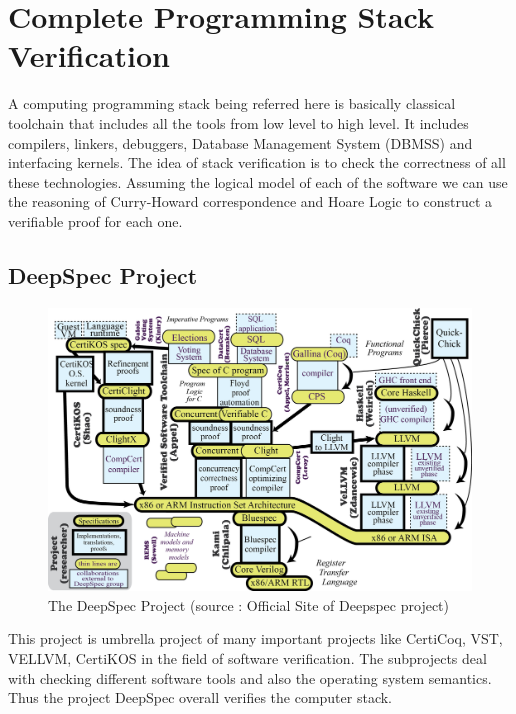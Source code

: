 \chapter{Complete Programming Stack Verification}
\graphicspath{ {./images/}} 

A computing programming stack being referred here is basically classical toolchain that includes all the tools from low level to high level. It includes compilers, linkers, debuggers, Database Management System (DBMSS) and interfacing kernels. The idea of stack verification is to check the correctness of all these technologies. Assuming the logical model of each of the software we can use the reasoning of Curry-Howard correspondence and Hoare Logic to construct a verifiable proof for each one.\\

\section{DeepSpec Project}


\begin{figure}[!htb]
\centering
  \includegraphics[scale=0.7]{deepspec}
  \caption{The DeepSpec Project (source : Official Site of Deepspec project)}
\end{figure}

This project \cite{deepspec} is umbrella project of many important projects like CertiCoq, VST, VELLVM, CertiKOS in the field of software verification. The subprojects deal with checking different software tools and also the operating system semantics. Thus the project DeepSpec overall verifies the computer stack. \\

